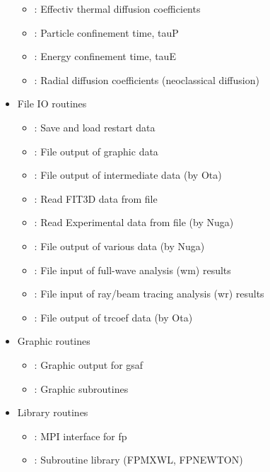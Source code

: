 \documentclass[11pt]{article}
\begin{document}
\begin{itemize}
\begin{itemize}
  \item[] : Effectiv thermal diffusion coefficients
  \item[] : Particle confinement time, tauP
  \item[] : Energy confinement time, tauE
  \item[] : Radial diffusion coefficients (neoclassical diffusion)
  \end{itemize}
\item
  File IO routines
  \begin{itemize}
  \item[] : Save and load restart data
  \item[] : File output of graphic data
  \item[] : File output of intermediate data (by Ota)
  \item[] : Read FIT3D data from file
  \item[] : Read Experimental data from file (by Nuga)
  \item[] : File output of various data (by Nuga)
  \item[] : File input of full-wave analysis (wm) results
  \item[] : File input of ray/beam tracing analysis
    (wr) results
  \item[] : File output of trcoef data (by Ota)
  \end{itemize}
\item
  Graphic routines
  \begin{itemize}
  \item[] : Graphic output for gsaf
  \item[] : Graphic subroutines
  \end{itemize}
\item
  Library routines
  \begin{itemize}
  \item[] : MPI interface for fp
  \item[] : Subroutine library (FPMXWL, FPNEWTON) 
  \end{itemize}


\end{itemize}
\end{document}
